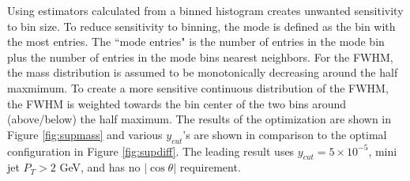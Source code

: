 Using estimators calculated from a binned histogram creates unwanted sensitivity to bin size. To reduce sensitivity to binning, the mode is defined as the bin with the most entries. The ``mode entries" is the number of entries in the mode bin plus the number of entries in the mode bins nearest neighbors. For the FWHM, the mass distribution is assumed to be monotonically decreasing around the half maxmimum. To create a more sensitive continuous distribution of the FWHM,  the FWHM is weighted towards the bin center of the two bins around (above/below) the half maximum. The results of the optimization are shown in Figure \ref{fig:supmass} and various $y_{cut}$'s are shown in comparison to the optimal configuration in Figure \ref{fig:supdiff}. The leading result uses $y_{cut} = 5\times 10^{-5}$, mini jet $P_T > 2$ GeV, and has no $|\cos \theta|$ requirement. 

